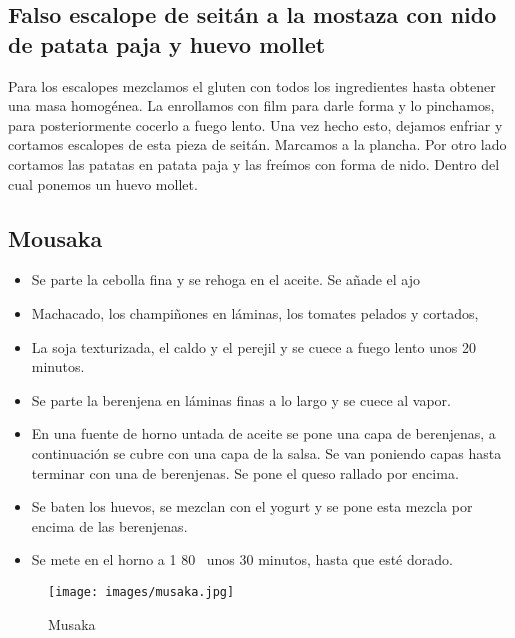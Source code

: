 \subsection{Falso escalope de seitán a la mostaza con nido de patata paja y huevo mollet}
\label{sec:escalopeSeitan}

Para los escalopes mezclamos el gluten con todos los ingredientes hasta obtener una masa homogénea. La enrollamos con film para darle forma y lo pinchamos, para posteriormente cocerlo a fuego lento. Una  vez hecho esto, dejamos enfriar y cortamos escalopes de esta pieza de  seitán. Marcamos a la plancha.
Por otro lado cortamos las patatas en patata paja y las freímos con forma de nido. Dentro del cual ponemos un huevo mollet.

\subsection{Mousaka}
\label{sec:musaka}
\begin{itemize}
\item Se parte la cebolla fina y se rehoga en el aceite. Se añade el ajo
\item Machacado, los champiñones en láminas, los tomates pelados y cortados,
\item La soja texturizada, el caldo y el perejil y se cuece a fuego lento unos 20 minutos.
\item Se parte la berenjena en láminas finas a lo largo y se cuece al vapor.
\item En una fuente de horno untada de aceite se pone una capa de berenjenas, a continuación se cubre con una capa de la salsa. Se van poniendo capas hasta terminar con una de berenjenas. Se pone el queso rallado por encima.
\item Se baten los huevos, se mezclan con el yogurt y se pone esta mezcla por encima de las berenjenas.
\item Se mete en el horno a 1 80~ unos 30 minutos, hasta que esté dorado.
\end{itemize}

\begin{figure}[h]
  \begin{center}
    \texttt{[image: images/musaka.jpg]}
    \caption{Musaka}
    \label{fig:musaka}
  \end{center}
\end{figure}


